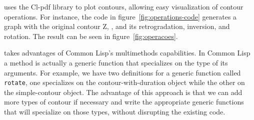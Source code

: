 \documentclass[a0paper]{sciposter}
\begin{document}
\begin{multicols}{3}
\goiaba{} uses the Cl-pdf library
to plot contours, allowing easy visualization of contour operations.
For instance, the code in figure~\ref{fig:operations-code} generates a
graph with the original contour Z, 
, and its
retrogradation, inversion, and rotation. The result can be seen in
figure~\ref{fig:operacoes}.

\goiaba{} takes advantages of Common Lisp's multimethods capabilities.
In Common Lisp a method is actually a generic function that
specializes on the type of its arguments. For example, we have two
definitions for a generic function called \texttt{rotate}, one
specializes on the contour-with-duration object while the other on the
simple-contour object. The advantage of this approach is that we can
add more types of contour if necessary and write the appropriate
generic functions that will specialize on those types, without
disrupting the existing code.

\end{multicols}
\end{document}

